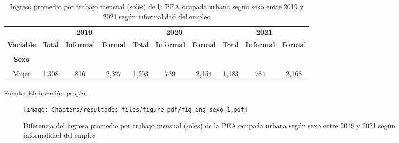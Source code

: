 \documentclass[
  letterpaper,
  12pt,
  oneside,
  spanish,
  doublespacing,
  headsepline,
  parskip]{MastersDoctoralThesis}
\begin{document}
\hypertarget{tbl-ing_sexo}{}
\begin{table}[H]
\caption{\label{tbl-ing_sexo}Ingreso promedio por trabajo mensual (soles) de la PEA ocupada urbana
según sexo entre 2019 y 2021 según informalidad del empleo }\tabularnewline

\centering\begingroup\fontsize{9}{11}\selectfont

\begin{tabular}{cccccccccc}
\toprule
\multicolumn{1}{c}{ } & \multicolumn{3}{c}{\textbf{2019}} & \multicolumn{3}{c}{\textbf{2020}} & \multicolumn{3}{c}{\textbf{2021}} \\
\cmidrule(l{3pt}r{3pt}){2-4} \cmidrule(l{3pt}r{3pt}){5-7} \cmidrule(l{3pt}r{3pt}){8-10}
\textbf{Variable} & Total & \textbf{Informal} & \textbf{Formal} & Total & \textbf{Informal} & \textbf{Formal} & Total & \textbf{Informal} & \textbf{Formal}\\
\midrule
\cellcolor{gray!6}{\textbf{Nacional}} & \cellcolor{gray!6}{1,595} & \cellcolor{gray!6}{1,037} & \cellcolor{gray!6}{2,599} & \cellcolor{gray!6}{1,407} & \cellcolor{gray!6}{901} & \cellcolor{gray!6}{2,380} & \cellcolor{gray!6}{1,443} & \cellcolor{gray!6}{989} & \cellcolor{gray!6}{2,473}\\
\textbf{Sexo} &  &  &  &  &  &  &  &  & \\
\cellcolor{gray!6}{Hombre} & \cellcolor{gray!6}{1,819} & \cellcolor{gray!6}{1,225} & \cellcolor{gray!6}{2,778} & \cellcolor{gray!6}{1,549} & \cellcolor{gray!6}{1,018} & \cellcolor{gray!6}{2,527} & \cellcolor{gray!6}{1,639} & \cellcolor{gray!6}{1,150} & \cellcolor{gray!6}{2,680}\\
Mujer & 1,308 & 816 & 2,327 & 1,203 & 739 & 2,154 & 1,183 & 784 & 2,168\\
\bottomrule
\end{tabular}
\endgroup{}
\end{table}

\noindent \small Fuente: Elaboración propia. \normalsize

\begin{figure}

\caption{\label{fig-ing_sexo}Diferencia del ingreso promedio por trabajo
mensual (soles) de la PEA ocupada urbana según sexo entre 2019 y 2021
según informalidad del empleo}

{\centering \texttt{[image: Chapters/resultados\_files/figure-pdf/fig-ing\_sexo-1.pdf]}

}

\end{figure}
\end{document}
